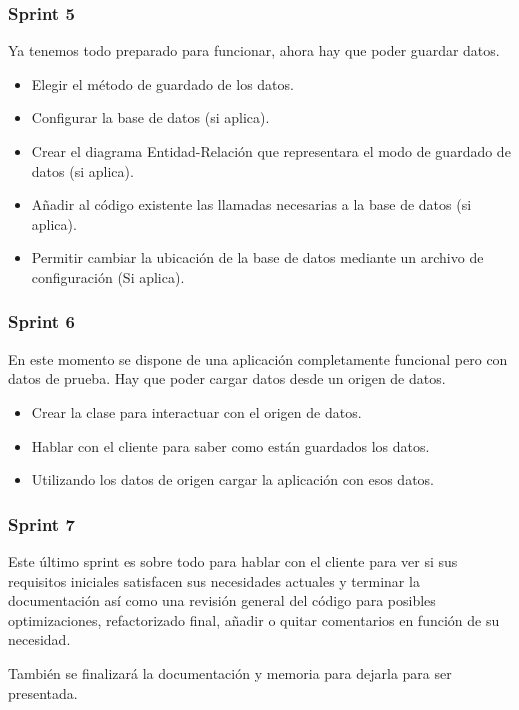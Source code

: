 \subsubsection{Sprint 5}
Ya tenemos todo preparado para funcionar, ahora hay que poder guardar datos.

\begin{itemize}
    \item Elegir el m\'etodo de guardado de los datos.
    \item Configurar la base de datos (si aplica).
    \item Crear el diagrama Entidad-Relaci\'{o}n que representara el modo de guardado de datos 
    (si aplica).
    \item A\~{n}adir al c\'{o}digo existente las llamadas necesarias a la base de datos (si 
    aplica).
    \item Permitir cambiar la ubicaci\'{o}n de la base de datos mediante un archivo de 
    configuraci\'{o}n (Si aplica).
\end{itemize}

\subsubsection{Sprint 6}
En este momento se dispone de una aplicaci\'{o}n completamente funcional pero con datos de 
prueba. 
Hay que poder cargar datos desde un origen de datos.

\begin{itemize}
    \item Crear la clase para interactuar con el origen de datos.
    \item Hablar con el cliente para saber como est\'{a}n guardados los datos.
    \item Utilizando los datos de origen cargar la aplicaci\'{o}n con esos datos.
\end{itemize}

\subsubsection{Sprint 7}
Este \'ultimo sprint es sobre todo para hablar con el cliente para
ver si sus requisitos iniciales satisfacen sus necesidades actuales
y terminar la documentaci\'on as\'i como una revisi\'on general del c\'odigo
para posibles optimizaciones, refactorizado final, a\~nadir o quitar comentarios
en funci\'on de su necesidad.

Tambi\'en se finalizar\'a la documentaci\'on y memoria para dejarla para ser presentada.

